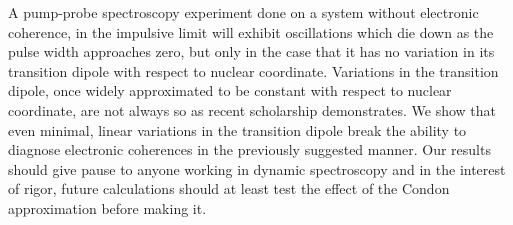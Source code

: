 A pump-probe spectroscopy experiment done on a system without electronic coherence, in the impulsive limit will exhibit oscillations which die down as the pulse width approaches zero, but only in the case that it has no variation in its transition dipole with respect to nuclear coordinate.  Variations in the transition dipole, once widely approximated to be constant with respect to nuclear coordinate, are not always so as recent scholarship demonstrates.  We show that even minimal, linear variations in the transition dipole break the ability to diagnose electronic coherences in the previously suggested manner.  Our results should give pause to anyone working in dynamic spectroscopy and in the interest of rigor, future calculations should at least test the effect of the Condon approximation before making it.
